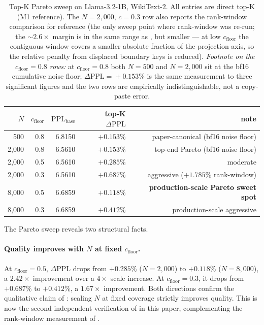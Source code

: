 \documentclass[11pt]{article}
\theoremstyle{definition}
\theoremstyle{remark}
\theoremstyle{plain}
\begin{document}
\begin{table}[h]
  \centering\small
  \caption{Top-K Pareto sweep on Llama-3.2-1B, WikiText-2.
    All entries are direct top-K (M1 reference). The $N\!=\!2{,}000$, $c\!=\!0.3$
    row also reports the rank-window comparison for reference (the only sweep
    point where rank-window was re-run; the $\sim\!2.6\times$ margin is in the
    same range as , but smaller --- at low $c_{\text{floor}}$ the
    contiguous window covers a smaller absolute fraction of the projection axis,
    so the relative penalty from displaced boundary keys is reduced).
    \emph{Footnote on the $c_{\text{floor}}\!=\!0.8$ rows:}
    at $c_{\text{floor}}\!=\!0.8$ both $N\!=\!500$ and $N\!=\!2{,}000$ sit at the
    bf16 cumulative noise floor; $\Delta\mathrm{PPL}\!=\!+0.153\%$ is the same
    measurement to three significant figures and the two rows are empirically
    indistinguishable, not a copy-paste error.}
  \label{tab:pareto}
  \begin{tabular}{rrrrr}
    \toprule
    $N$ & $c_{\text{floor}}$ & $\mathrm{PPL}_{\text{base}}$ & top-K $\Delta\mathrm{PPL}$ & note \\
    \midrule
    500    & 0.8 & 6.8150 & $+0.153\%$ & paper-canonical (bf16 noise floor) \\
    2{,}000  & 0.8 & 6.5610 & $+0.153\%$ & top-end Pareto (bf16 noise floor) \\
    2{,}000  & 0.5 & 6.5610 & $+0.285\%$ & moderate \\
    2{,}000  & 0.3 & 6.5610 & $+0.687\%$ & aggressive  ($+1.785\%$ rank-window) \\
    8{,}000  & 0.5 & 6.6859 & \textbf{$+0.118\%$} & \textbf{production-scale Pareto sweet spot} \\
    8{,}000  & 0.3 & 6.6859 & $+0.412\%$ & production-scale aggressive \\
    \bottomrule
  \end{tabular}
\end{table}

The Pareto sweep reveals two structural facts.

\paragraph{Quality improves with $N$ at fixed $c_{\text{floor}}$.}
At $c_{\text{floor}}\!=\!0.5$, $\Delta\mathrm{PPL}$ drops from $+0.285\%$
($N\!=\!2{,}000$) to $+0.118\%$ ($N\!=\!8{,}000$), a $2.42\times$ improvement
over a $4\times$ scale increase. At $c_{\text{floor}}\!=\!0.3$, it drops from
$+0.687\%$ to $+0.412\%$, a $1.67\times$ improvement. Both directions confirm
the qualitative claim of : scaling $N$ at fixed coverage
strictly improves quality. This is now the second independent verification
of  in this paper, complementing the rank-window
measurement of .
\end{document}
